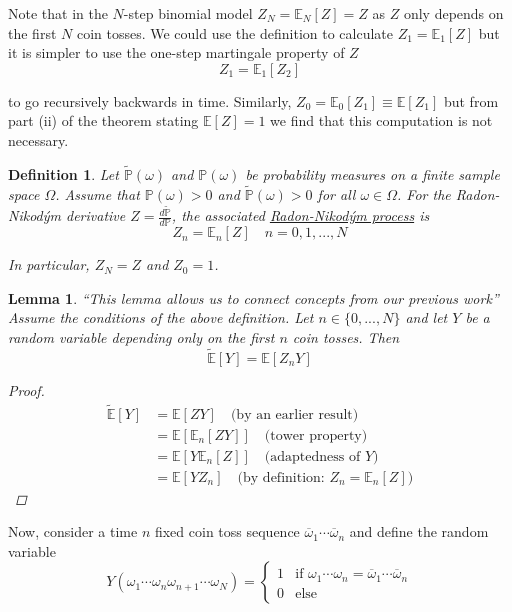 \documentclass[12pt]{article}
\newtheorem{definition}{Definition}
\newtheorem{lemma}{Lemma}
\newlength\tindent
\renewcommand{\indent}{\hspace*{\tindent}}
\renewcommand{\P}{\mathbb P}
\newcommand{\E}{\mathbb E}
\begin{document}
\indent Note that in the $N$-step binomial model $Z_N = \E_N[Z] = Z$ as $Z$ only depends on the first $N$ coin tosses. We could use the definition to calculate $Z_1 = \E_1[Z]$ but it is simpler to use the one-step martingale property of $Z$
\begin{equation*}
	Z_1 = \E_1[Z_2]
\end{equation*}

to go recursively backwards in time. Similarly, $Z_0 = \E_0[Z_1] \equiv \E[Z_1]$ but from part (ii) of the theorem stating $\E[Z] = 1$ we find that this computation is not necessary.

\begin{definition} Let $\tilde{\P}(\omega)$ and $\P(\omega)$ be probability measures on a finite sample space $\Omega$. Assume that $\P(\omega) > 0$ and $\tilde{\P}(\omega) > 0$ for all $\omega \in \Omega$. For the Radon-Nikod\'{y}m derivative $Z = \frac{ d\tilde{\P} }{ d\P }$, the associated \underline{Radon-Nikod\'{y}m process} is
\begin{equation*}
	Z_n = \E_n[Z] \quad n = 0, 1, ..., N
\end{equation*}

In particular, $Z_N = Z$ and $Z_0 = 1$.
\end{definition}

\begin{lemma} ``{\em This lemma allows us to connect concepts from our previous work}'' Assume the conditions of the above definition. Let $n \in \{0,..., N\}$ and let $Y$ be a random variable depending only on the first $n$ coin tosses. Then
\begin{equation*}
	\tilde{\E}[Y] = \E[Z_n Y]
\end{equation*}

\begin{proof} 
\begin{align*}
	\tilde{\E}[Y] &= \E[ZY] \quad \text{(by an earlier result)} \\
	&= \E[\E_n[ZY]] \quad \text{(tower property)} \\
	&= \E[Y\E_n[Z]] \quad \text{(adaptedness of $Y$)} \\
	&= \E[YZ_n] \quad \text{(by definition: } Z_n = \E_n[Z])
\end{align*}
\end{proof}
\end{lemma}

Now, consider a time $n$ fixed coin toss sequence $\overline{\omega}_1\cdots\overline{\omega}_n$ and define the random variable
\begin{equation*}
	Y(\omega_1\cdots\omega_n\omega_{n + 1}\cdots\omega_N) = 
	\begin{cases}
		1 & \text{if } \omega_1\cdots\omega_n = \overline{\omega}_1\cdots\overline{\omega}_n \\
		0 & \text{else}
	\end{cases}
\end{equation*}
\end{document}
